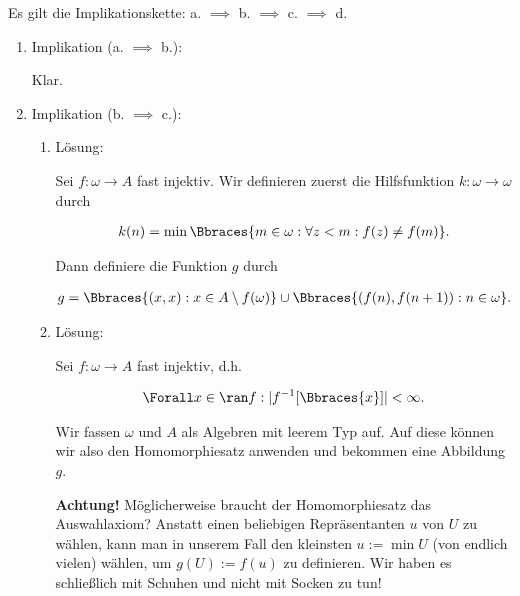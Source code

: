 \begin{solution}

Es gilt die Implikationskette: a. $\implies$ b. $\implies$ c. $\implies$ d.

\begin{enumerate}[label = \arabic*.]

  \item Implikation (a. $\implies$ b.):
  
  Klar.

  \item Implikation (b. $\implies$ c.):
  
  \begin{enumerate}[label = \arabic*.]

    \item Lösung:

    Sei $f: \omega \to A$ fast injektiv.
    Wir definieren zuerst die Hilfsfunktion $k: \omega \to \omega$ durch
  
    \begin{align*}
      k(n) = \min \Bbraces{m \in \omega: \forall z < m: f(z) \neq f(m)}.
    \end{align*}
  
    Dann definiere die Funktion $g$ durch
  
    \begin{align*}
      g = \Bbraces{(x, x): x \in A \setminus f(\omega)} \cup \Bbraces{(f(n), f(n+1)): n \in \omega}.
    \end{align*}

    \item Lösung:
    
    Sei $f: \omega \to A$ fast injektiv, d.h.

    \begin{align*}
      \Forall x \in \ran f:
      |f^{-1}[\Bbraces{x}]| < \infty.
    \end{align*}

    Wir fassen $\omega$ und $A$ als Algebren mit leerem Typ auf.
    Auf diese können wir also den Homomorphiesatz anwenden und bekommen eine Abbildung $g$.

    \textbf{Achtung!}
    Möglicherweise braucht der Homomorphiesatz das Auswahlaxiom?
    Anstatt einen beliebigen Repräsentanten $u$ von $U$ zu wählen, kann man in unserem Fall den kleinsten $u := \min U$ (von endlich vielen) wählen, um $g(U) := f(u)$ zu definieren.
    Wir haben es schließlich mit Schuhen und nicht mit Socken zu tun!

    \phantom{}


\end{enumerate}
\end{enumerate}
\end{solution}
